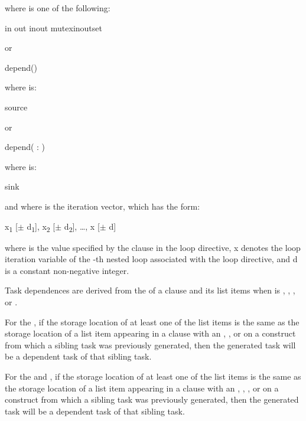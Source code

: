 where  is one of the following:
\begin{indentedcodelist}
in
out
inout
mutexinoutset
\end{indentedcodelist}

or

\begin{ompSyntax}
depend()
\end{ompSyntax}

where  is:
\begin{indentedcodelist}
source
\end{indentedcodelist}

or

\begin{ompSyntax}
depend( : )
\end{ompSyntax}

where  is:
\begin{indentedcodelist}
sink
\end{indentedcodelist}

and where  is the iteration vector, which has the form:

x\textsubscript{1} [$\pm $ d\textsubscript{1}], x\textsubscript{2} [$\pm $ d\textsubscript{2}], \ldots, x\textsubscript{} [$\pm $ d\textsubscript{}]

where  is the value specified by the  clause in the loop
directive, x\textsubscript{} denotes the loop iteration variable of the -th
nested loop associated with the loop directive, and d\textsubscript{} is a
constant non-negative integer.

\descr
Task dependences are derived from the  of a  clause and its list
items when  is , , , or .

For the  , if the storage location of at least one
of the list items is the same as the storage location of a list item appearing
in a  clause with an , , or   on a construct
from which a sibling task was previously generated, then the generated task
will be a dependent task of that sibling task.

For the  and  , if the storage location of at least one
of the list items is the same as the storage location of a list item appearing
in a  clause with an , , , or   on
a construct from which a sibling task was previously generated, then the
generated task will be a dependent task of that sibling task.

